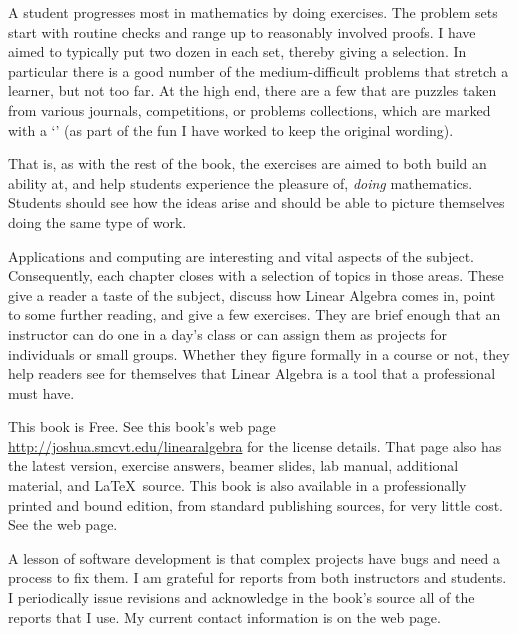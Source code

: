 {A student progresses most in mathematics by doing exercises. 
The problem sets start with 
routine checks and range up to reasonably involved proofs.
I have aimed to typically put two dozen in each set, 
thereby giving a selection.
In particular there is a good number of the medium-difficult problems
that stretch a learner, but not too far.
At the high end, there are a few that are puzzles
taken from various journals, competitions, or
problems collections, which  
are marked with a
`\puzzlemark'  
(as part of the fun I have worked to keep the original wording).

That is, as with the rest of the book, 
the exercises are aimed to both build an ability at,
and help students experience the pleasure of, 
\emph{doing} mathematics.
Students should see how the ideas arise and should be able to 
picture themselves doing the same type of work.


\medskip
{}
Applications and computing are interesting and vital aspects 
of the subject.
Consequently, each chapter closes with a selection of
topics in those areas.
These give a reader
a taste of the subject, discuss how Linear Algebra comes in,
point to some further reading, and give a few exercises. 
They are brief enough that an instructor can do one
in a day's class 
or can assign them as projects for individuals or small groups.
Whether they figure formally in a course or not, they help
readers see for themselves that Linear Algebra is a tool
that a professional must have. 




\medskip
{}
This book is Free.
See this book's web page 
\url{http://joshua.smcvt.edu/linearalgebra}
for the license details.
That page also has the latest version, 
exercise answers, beamer slides, lab manual, additional material,
and \LaTeX\ source.
This book is also available in a professionally printed and bound edition,
from standard publishing sources, for very little cost.
See the web page.



\medskip
{}
A lesson of software
development is that complex projects have bugs
and need a process to fix them.
I am grateful for reports from both instructors and students.
I periodically issue revisions and acknowledge in the book's source
all of the reports that I use. 
My current contact information is on the web page.

}

